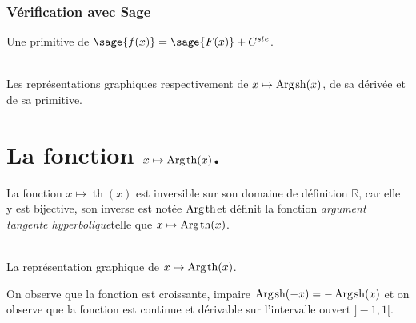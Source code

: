 \documentclass[a4paper,landscape,17pt]{extreport} %
\def\eclaire{\mathbb}
\def\R{\ensuremath{\eclaire R}}
\renewcommand{\sinh}{\mathop{\mathrm{sh}}}
\renewcommand{\tanh}{\mathop{\mathrm{th}}}
\renewcommand{\arg}{\mathop{\mathrm{Arg}}}
\begin{document}
\subsubsection{Vérification avec Sage}

Une primitive de $\sage{f(x)} = \sage{F(x)} + C^{ste} $.

\begin{center}
\\
Les représentations graphiques respectivement de $x \mapsto \arg\mspace{-1mu}\sinh(x)$, de sa dérivée et de sa primitive.
\end{center}

\section{La fonction  $x \mapsto \arg\mspace{-1mu}\tanh(x)$.}

La fonction $x \mapsto \tanh(x)$ est inversible sur son domaine de définition $\R$, car elle y est bijective, son inverse est notée \og$ \arg\mspace{-1mu}\tanh $\fg et définit la fonction \og\emph{argument tangente hyperbolique}\fg telle que $x \mapsto \arg\mspace{-1mu}\tanh(x)$.


\begin{center}
 \\
La représentation graphique de $x \mapsto \arg\mspace{-1mu}\tanh(x)$.
\end{center}
On observe que la fonction est croissante, impaire $\arg\mspace{-1mu}\sinh(-x) = -\arg\mspace{-1mu}\sinh(x) $
et on observe que la fonction est continue et dérivable sur l'intervalle ouvert $]-1,1[$.                                                                                                             
\end{document}
